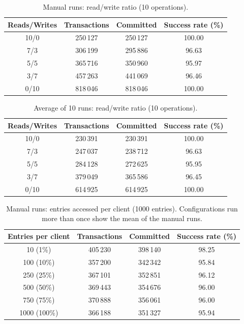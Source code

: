\begin{table}[h]
\centering
\caption{Manual runs: read/write ratio (10 operations).}
\begin{tabular}{|c|c|c|c|}
\hline
Reads/Writes & Transactions & Committed & Success rate (\%) \\
\hline
10/0 & 250\,127 & 250\,127 & 100.00 \\
7/3 & 306\,199 & 295\,886 & 96.63 \\
5/5 & 365\,716 & 350\,960 & 95.97 \\
3/7 & 457\,263 & 441\,069 & 96.46 \\
0/10 & 818\,046 & 818\,046 & 100.00 \\
\hline
\end{tabular}
\end{table}

\begin{table}[h]
\centering
\caption{Average of 10 runs: read/write ratio (10 operations).}
\begin{tabular}{|c|c|c|c|}
\hline
Reads/Writes & Transactions & Committed & Success rate (\%) \\
\hline
10/0 & 230\,391 & 230\,391 & 100.00 \\
7/3 & 247\,037 & 238\,712 & 96.63 \\
5/5 & 284\,128 & 272\,625 & 95.95 \\
3/7 & 379\,049 & 365\,586 & 96.45 \\
0/10 & 614\,925 & 614\,925 & 100.00 \\
\hline
\end{tabular}
\end{table}

\begin{table}[h]
\centering
\caption{Manual runs: entries accessed per client (1000 entries). Configurations run more than once show the mean of the manual runs.}
\begin{tabular}{|c|c|c|c|}
\hline
Entries per client & Transactions & Committed & Success rate (\%) \\
\hline
10 (1\%) & 405\,230 & 398\,140 & 98.25 \\
100 (10\%) & 357\,200 & 342\,342 & 95.84 \\
250 (25\%) & 367\,101 & 352\,851 & 96.12 \\
500 (50\%) & 369\,443 & 354\,676 & 96.00 \\
750 (75\%) & 370\,888 & 356\,061 & 96.00 \\
1000 (100\%) & 366\,188 & 351\,327 & 95.94 \\
\hline
\end{tabular}
\end{table}

